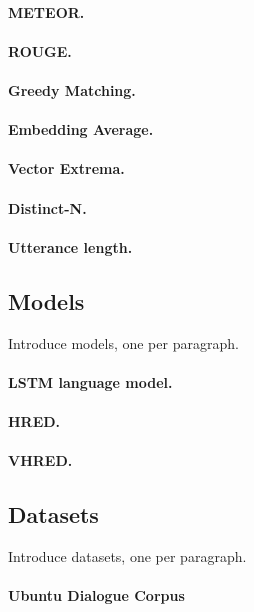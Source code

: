 \documentclass[runningheads]{llncs}
\begin{document}
    \paragraph{METEOR.}
    \paragraph{ROUGE.}

    \paragraph{Greedy Matching.}
    \paragraph{Embedding Average.}
    \paragraph{Vector Extrema.}

    \paragraph{Distinct-N.}
    \paragraph{Utterance length.}

    \subsection{Models}
    Introduce models, one per paragraph.
    \paragraph{LSTM language model.}
    \paragraph{HRED.}
    \paragraph{VHRED.}

    \subsection{Datasets}
    Introduce datasets, one per paragraph.
    \paragraph{Ubuntu Dialogue Corpus}
\end{document}
